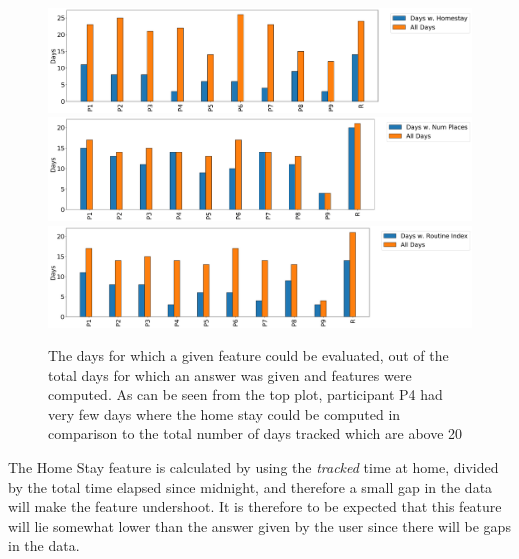 \begin{figure}[h]
    \centering
    \includegraphics[width=\textwidth]{images/study/homestay_valid_days.png}
    \includegraphics[width=\textwidth]{images/study/numplaces_valid_days.png}
    \includegraphics[width=\textwidth]{images/study/routine_valid_days.png}
    \caption{The days for which a given feature could be evaluated, out of the total days for which an answer was given and features were computed. As can be seen from the top plot, participant P4 had very few days where the home stay could be computed in comparison to the total number of days tracked which are above 20}
    \label{fig:plot-daily}
\end{figure}

The Home Stay feature is calculated by using the \textit{tracked} time at home, divided by the total time elapsed since midnight, and therefore a small gap in the data will make the feature undershoot. It is therefore to be expected that this feature will lie somewhat lower than the answer given by the user since there will be gaps in the data. \\

